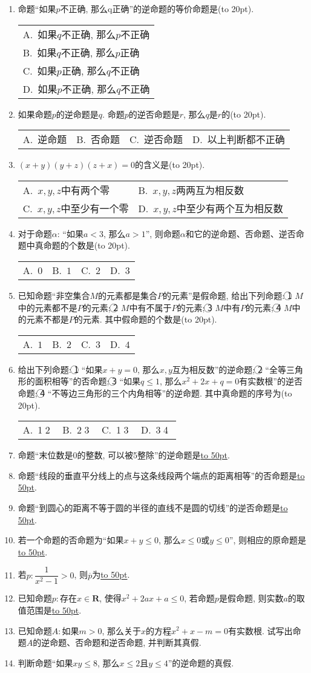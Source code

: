 \documentclass[10pt,a4paper]{article}
\newcommand{\blank}[1]{\underline{\hbox to #1pt{}}}
\newcommand{\bracket}[1]{(\hbox to #1pt{})}
\newcommand{\onech}[4]{\par\begin{tabular}{p{.9\textwidth}}
A.~#1\\
B.~#2\\
C.~#3\\
D.~#4
\end{tabular}}
\newcommand{\twoch}[4]{\par\begin{tabular}{p{.46\textwidth}p{.46\textwidth}}
A.~#1& B.~#2\\
C.~#3& D.~#4
\end{tabular}}
\newcommand{\fourch}[4]{\par\begin{tabular}{p{.23\textwidth}p{.23\textwidth}p{.23\textwidth}p{.23\textwidth}}
A.~#1 &B.~#2& C.~#3& D.~#4
\end{tabular}}
\begin{document}
\begin{enumerate}[1.]
\item 命题``如果$p$不正确, 那么q正确''的逆命题的等价命题是\bracket{20}.
\onech{如果$q$不正确, 那么$p$不正确}{如果$q$不正确, 那么$p$正确}{如果$p$正确, 那么$q$不正确}{如果$p$不正确, 那么$q$不正确}
\item 如果命题$p$的逆命题是$q$. 命题$p$的逆否命题是$r$, 那么$q$是$r$的\bracket{20}.
\fourch{逆命题}{否命题}{逆否命题}{以上判断都不正确}
\item $(x+y)(y+z)(z+x)=0$的含义是\bracket{20}.
\twoch{$x,y,z$中有两个零}{$x,y,z$两两互为相反数}{$x,y,z$中至少有一个零}{$x,y,z$中至少有两个互为相反数}
\item 对于命题$\alpha$: ``如果$a<3$, 那么$a>1$'', 则命题$\alpha$和它的逆命题、否命题、逆否命题中真命题的个数是\bracket{20}.
\fourch{$0$}{$1$}{$2$}{$3$}
\item 已知命题``非空集合$M$的元素都是集合$P$的元素''是假命题, 给出下列命题: \textcircled{1} $M$中的元素都不是$P$的元素; \textcircled{2} $M$中有不属于$P$的元素; \textcircled{3} $M$中有$P$的元素; \textcircled{4} $M$中的元素不都是$P$的元素. 其中假命题的个数是\bracket{20}.
\fourch{$1$}{$2$}{$3$}{$4$}
\item 给出下列命题: \textcircled{1} ``如果$x+y=0$, 那么$x,y$互为相反数''的逆命题; \textcircled{2} ``全等三角形的面积相等''的否命题; \textcircled{3} ``如果$q\le 1$, 那么$x^2+2x+q=0$有实数根''的逆否命题; \textcircled{4} ``不等边三角形的三个内角相等''的逆命题. 其中真命题的序号为\bracket{20}.
\fourch{\textcircled{1}\textcircled{2}}{\textcircled{2}\textcircled{3}}{\textcircled{1}\textcircled{3}}{\textcircled{3}\textcircled{4}}
\item 命题``末位数是0的整数, 可以被5整除''的逆命题是\blank{50}.
\item 命题``线段的垂直平分线上的点与这条线段两个端点的距离相等''的否命题是\blank{50}.
\item 命题``到圆心的距离不等于圆的半径的直线不是圆的切线''的逆否命题是\blank{50}.
\item 若一个命题的否命题为``如果$x+y\le 0$, 那么$x\le 0$或$y\le 0$'', 则相应的原命题是\blank{50}.
\item 若$p:\dfrac 1{x^2-1}>0$, 则$\overline p$为\blank{50}.
\item 已知命题$p:$存在$x\in \mathbf{R}$, 使得$x^2+2ax+a\le 0$, 若命题$p$是假命题, 则实数$a$的取值范围是\blank{50}.
\item 已知命题$A:$如果$m>0$, 那么关于$x$的方程$x^2+x-m=0$有实数根.
试写出命题$A$的逆命题、否命题和逆否命题, 并判断其真假.
\item 判断命题``如果$xy\le 8$, 那么$x\le 2$且$y\le 4$''的逆命题的真假.

\end{enumerate}
\end{document}
